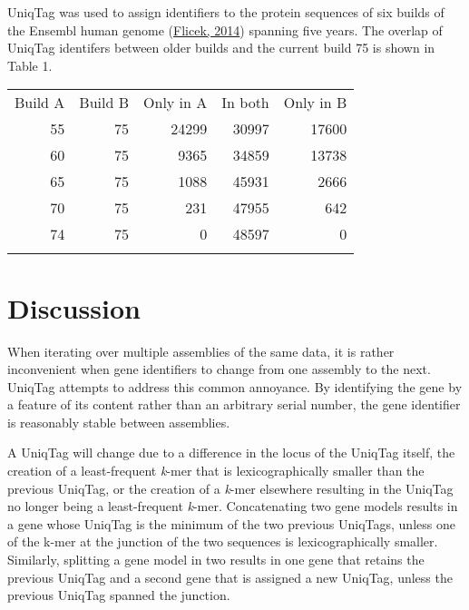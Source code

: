 \documentclass{bioinfo}
\begin{document}
UniqTag was used to assign identifiers to the protein sequences of six
builds of the Ensembl human genome
(\href{http://dx.doi.org/10.1093/nar/gkt1196}{Flicek, 2014}) spanning
five years. The overlap of UniqTag identifers between older builds and
the current build 75 is shown in Table 1.

\begin{table}[!h]
{
\begin{tabular}{rrrrr}
\hline\noalign{\medskip}
Build A & Build B & Only in A & In both & Only in B
\\\noalign{\medskip}
\hline\noalign{\medskip}
55 & 75 & 24299 & 30997 & 17600
\\\noalign{\medskip}
60 & 75 & 9365 & 34859 & 13738
\\\noalign{\medskip}
65 & 75 & 1088 & 45931 & 2666
\\\noalign{\medskip}
70 & 75 & 231 & 47955 & 642
\\\noalign{\medskip}
74 & 75 & 0 & 48597 & 0
\\\noalign{\medskip}
\hline
\noalign{\medskip}
\end{tabular}
}{}
\end{table}

\section{Discussion}

When iterating over multiple assemblies of the same data, it is rather
inconvenient when gene identifiers to change from one assembly to the
next. UniqTag attempts to address this common annoyance. By identifying
the gene by a feature of its content rather than an arbitrary serial
number, the gene identifier is reasonably stable between assemblies.

A UniqTag will change due to a difference in the locus of the UniqTag
itself, the creation of a least-frequent \emph{k}-mer that is
lexicographically smaller than the previous UniqTag, or the creation of
a \emph{k}-mer elsewhere resulting in the UniqTag no longer being a
least-frequent \emph{k}-mer. Concatenating two gene models results in a
gene whose UniqTag is the minimum of the two previous UniqTags, unless
one of the k-mer at the junction of the two sequences is
lexicographically smaller. Similarly, splitting a gene model in two
results in one gene that retains the previous UniqTag and a second gene
that is assigned a new UniqTag, unless the previous UniqTag spanned the
junction.
\end{document}
